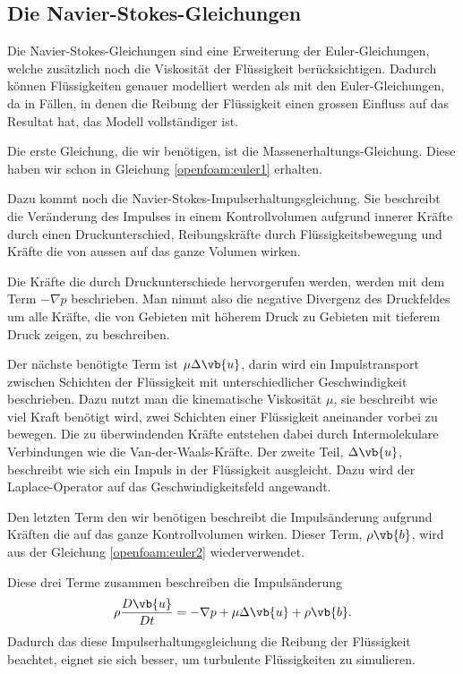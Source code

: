 \subsection{Die Navier-Stokes-Gleichungen}
Die Navier-Stokes-Gleichungen sind eine Erweiterung der Euler-Gleichungen, welche zusätzlich noch die Viskosität der Flüssigkeit berücksichtigen.
Dadurch können Flüssigkeiten genauer modelliert werden als mit den Euler-Gleichungen, da in Fällen, in denen die Reibung der Flüssigkeit einen grossen Einfluss auf das Resultat hat, das Modell vollständiger ist.

Die erste Gleichung, die wir benötigen, ist die Massenerhaltungs-Gleichung.
Diese haben wir schon in Gleichung \eqref{openfoam:euler1} erhalten.

Dazu kommt noch die Navier-Stokes-Impulserhaltungsgleichung.
Sie beschreibt die Veränderung des Impulses in einem Kontrollvolumen aufgrund innerer Kräfte durch einen Druckunterschied, Reibungskräfte durch Flüssigkeitsbewegung und Kräfte die von aussen auf das ganze Volumen wirken.

Die Kräfte die durch Druckunterschiede hervorgerufen werden, werden mit dem Term $- \nabla p$ beschrieben.
Man nimmt also die negative Divergenz des Druckfeldes um alle Kräfte, die von Gebieten mit höherem Druck zu Gebieten mit tieferem Druck zeigen, zu beschreiben.

Der nächste benötigte Term ist $\mu \Delta \vb{u}$, darin wird ein Impulstransport zwischen Schichten der Flüssigkeit mit unterschiedlicher Geschwindigkeit beschrieben.
Dazu nutzt man die kinematische Viskosität $\mu$, sie beschreibt wie viel Kraft benötigt wird, zwei Schichten einer Flüssigkeit aneinander vorbei zu bewegen.
Die zu überwindenden Kräfte entstehen dabei durch Intermolekulare Verbindungen wie die Van-der-Waals-Kräfte.
Der zweite Teil, $\Delta \vb{u}$, beschreibt wie sich ein Impuls in der Flüssigkeit ausgleicht.
Dazu wird der Laplace-Operator auf das Geschwindigkeitsfeld angewandt.

Den letzten Term den wir benötigen beschreibt die Impulsänderung aufgrund Kräften die auf das ganze Kontrollvolumen wirken.
Dieser Term, $\rho \vb{b}$, wird aus der Gleichung \eqref{openfoam:euler2} wiederverwendet.

Diese drei Terme zusammen beschreiben die Impulsänderung 
\begin{equation}
\rho \frac{D\vb{u}}{Dt}
=
- \nabla p + \mu \Delta \vb{u} +\rho \vb{b} 
.\end{equation}
Dadurch das diese Impulserhaltungsgleichung die Reibung der Flüssigkeit beachtet, eignet sie sich besser, um turbulente Flüssigkeiten zu simulieren. 

